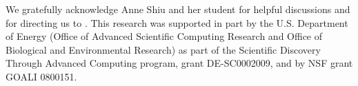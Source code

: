 \documentclass[smallextended]{svjour3}       %
\newcommand*{\0}{\mathbf{0}}
\newcommand*{\1}{\mathbf{1}}
\begin{document}

\enlargethispage{3\baselineskip}

\begin{acknowledgements}
We gratefully acknowledge Anne Shiu and her student for helpful
discussions and for directing us to \cite{Deng}.
This research was supported in part by the U.S. Department of Energy (Office
of Advanced Scientific Computing Research and Office of Biological
and Environmental Research) as part of the Scientific Discovery
Through Advanced Computing program, grant DE-SC0002009,
and by NSF grant GOALI 0800151.
\end{acknowledgements}

\frenchspacing
 
{}
\end{document}
